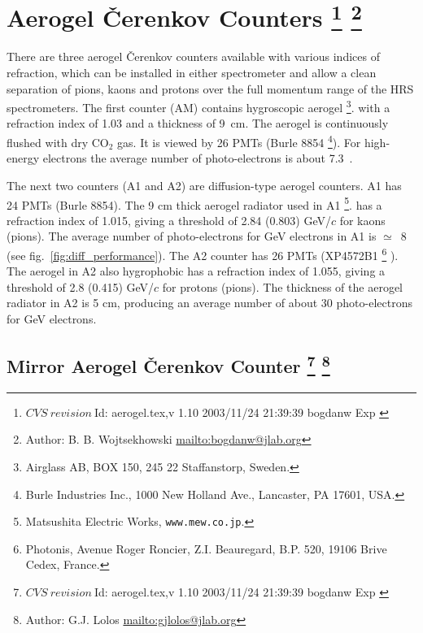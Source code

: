 
\section[Aerogel \v{C}erenkov Counter]{Aerogel \v{C}erenkov Counters
\footnote{
  $CVS~revision~ $Id: aerogel.tex,v 1.10 2003/11/24 21:39:39 bogdanw Exp $ $
}
\footnote{Author: B. B. Wojtsekhowski \url{mailto:bogdanw@jlab.org}}
}
There are  three aerogel \v{C}erenkov counters available with various indices
of refraction, which can be installed in either spectrometer 
and allow a clean separation of pions, kaons and protons over 
the full momentum range of the HRS spectrometers.
The first counter (AM) contains hygroscopic aerogel
\footnote{Airglass AB, BOX 150, 245 22 Staffanstorp, Sweden.}.
with a refraction index of 1.03 and a thickness of 9~cm. 
The aerogel is continuously flushed with dry CO$_{2}$ gas.  
It is viewed by 26 PMTs (Burle 8854
\footnote{Burle Industries Inc., 1000 New Holland Ave., Lancaster, PA 17601, USA.}). 
For high-energy electrons the average 
number of photo-electrons is about 7.3~\cite{Brash:2002vn}.

The next two counters (A1 and A2) are diffusion-type aerogel counters.
A1 has 24 PMTs (Burle 8854). The 9 cm thick aerogel radiator used in A1
\footnote{ Matsushita Electric Works, {\tt www.mew.co.jp}.}.
has a refraction index of 1.015, giving a threshold of 2.84 (0.803) GeV/$c$ for
kaons (pions). The average number of photo-electrons for GeV electrons
in A1 is $\simeq$~8 (see fig.~\ref{fig:diff_performance}). The A2 counter has 26 PMTs
(XP4572B1 \footnote{Photonis, Avenue Roger Roncier, Z.I. Beauregard,
B.P. 520, 19106 Brive Cedex, France.} ).
The aerogel in A2 also hygrophobic has a refraction index of 1.055, 
giving a threshold of 2.8 (0.415) GeV/$c$ for protons (pions). 
The thickness of the aerogel radiator in A2 is 5 cm, producing an average
number of about 30 photo-electrons for GeV electrons.


\subsection[Mirror Aerogel \v{C}erenkov Counter]{Mirror Aerogel \v{C}erenkov Counter
\footnote{
  $CVS~revision~ $Id: aerogel.tex,v 1.10 2003/11/24 21:39:39 bogdanw Exp $ $
}
\footnote{Author: G.J. Lolos \url{mailto:gjlolos@jlab.org}}
}

